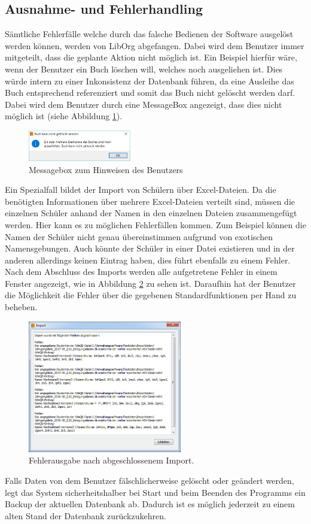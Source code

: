 \subsection{Ausnahme- und Fehlerhandling}
Sämtliche Fehlerfälle welche durch das falsche Bedienen der Software ausgelöst werden können, werden von LibOrg abgefangen. Dabei wird dem Benutzer immer mitgeteilt, dass die geplante Aktion nicht möglich ist. Ein Beispiel hierfür wäre, wenn der Benutzer ein Buch löschen will, welches noch ausgeliehen ist. Dies würde intern zu einer Inkonsistenz der Datenbank führen, da eine Ausleihe das Buch entsprechend referenziert und somit das Buch nicht gelöscht werden darf. Dabei wird dem Benutzer durch eine MessageBox angezeigt, dass dies nicht möglich ist (siehe Abbildung \ref{fig:error}).
\begin{figure}[H]
	\centering
	\includegraphics[width=0.40\textwidth]{figures/konzept/error.PNG}
	\caption{Messagebox zum Hinweisen des Benutzers}
	\label{fig:error}
\end{figure}
Ein Spezialfall bildet der Import von Schülern über Excel-Dateien. Da die benötigten Informationen über mehrere Excel-Dateien verteilt sind, müssen die einzelnen Schüler anhand der Namen in den einzelnen Dateien zusammengefügt werden. Hier kann es zu möglichen Fehlerfällen kommen. Zum Beispiel können die Namen der Schüler nicht genau übereinstimmen aufgrund von exotischen Namensgebungen. Auch könnte der Schüler in einer Datei existieren und in der anderen allerdings keinen Eintrag haben, dies führt ebenfalls zu einem Fehler. Nach dem Abschluss des Imports werden alle aufgetretene Fehler in einem Fenster angezeigt, wie in Abbildung \ref{fig:import} zu sehen ist. Daraufhin hat der Benutzer die Möglichkeit die Fehler über die gegebenen Standardfunktionen per Hand zu beheben.
\begin{figure}[H]
	\centering
	\includegraphics[width=0.60\textwidth]{figures/konzept/import.PNG}
	\caption{Fehlerausgabe nach abgeschlossenem Import.}
	\label{fig:import}
\end{figure}
Falls Daten von dem Benutzer fälschlicherweise gelöscht oder geändert werden, legt das System sicherheitshalber bei Start und beim Beenden des Programms ein Backup der aktuellen Datenbank ab. Dadurch ist es möglich jederzeit zu einem alten Stand der Datenbank zurückzukehren.

